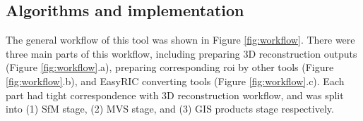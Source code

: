 \documentclass{configs/bmcart}
\begin{document}
\begin{table}[htbp]
  \caption{Trail field and image collection information}
  \centering
  \label{tab:diginfo}
\end{table}

\subsection*{Algorithms and implementation}

The general workflow of this tool was shown in Figure \ref{fig:workflow}. There were three main parts of this workflow, including preparing 3D reconstruction outputs (Figure \ref{fig:workflow}.a), preparing corresponding \acrfull*{roi} by other tools (Figure \ref{fig:workflow}.b), and EasyRIC converting tools (Figure \ref{fig:workflow}.c). Each part had tight correspondence with 3D reconstruction workflow, and was split into (1) SfM stage, (2) MVS stage, and (3) GIS products stage respectively.
\end{document}
